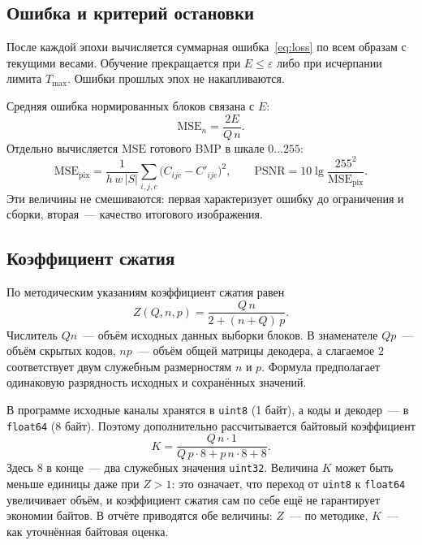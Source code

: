 \subsection{Ошибка и критерий остановки}
\label{sec:theory-stop}

После каждой эпохи вычисляется суммарная ошибка~\eqref{eq:loss} по всем образам с текущими весами. Обучение прекращается при $E \le \varepsilon$ либо при исчерпании лимита $T_{\max}$. Ошибки прошлых эпох не накапливаются.

Средняя ошибка нормированных блоков связана с $E$:
\begin{equation}
	\mathrm{MSE}_n = \frac{2E}{Q\,n}.
	\label{eq:mse-n}
\end{equation}
Отдельно вычисляется $\mathrm{MSE}$ готового BMP в шкале $0\ldots255$:
\begin{equation}
	\mathrm{MSE}_{\mathrm{pix}} = \frac{1}{h\,w\,|S|}
	  \sum_{i,j,c}\bigl(C_{ijc}-C'_{ijc}\bigr)^2,
	\qquad
	\mathrm{PSNR} = 10\lg\frac{255^2}{\mathrm{MSE}_{\mathrm{pix}}}.
	\label{eq:psnr}
\end{equation}
Эти величины не смешиваются: первая характеризует ошибку до ограничения и сборки, вторая~--- качество итогового изображения.

\subsection{Коэффициент сжатия}
\label{sec:theory-comp}

По методическим указаниям коэффициент сжатия равен
\begin{equation}
	Z(Q,n,p) = \frac{Q\,n}{2+(n+Q)\,p}.
	\label{eq:Z-theory}
\end{equation}
Числитель $Qn$~--- объём исходных данных выборки блоков. В знаменателе $Qp$~--- объём скрытых кодов, $np$~--- объём общей матрицы декодера, а слагаемое $2$ соответствует двум служебным размерностям $n$ и $p$. Формула предполагает одинаковую разрядность исходных и сохранённых значений.

В программе исходные каналы хранятся в \texttt{uint8} (1 байт), а коды и декодер~--- в \texttt{float64} (8 байт). Поэтому дополнительно рассчитывается байтовый коэффициент
\begin{equation}
	K = \frac{Q\,n \cdot 1}{Q\,p \cdot 8 + p\,n \cdot 8 + 8}.
	\label{eq:K-byte}
\end{equation}
Здесь $8$ в конце~--- два служебных значения \texttt{uint32}. Величина $K$ может быть меньше единицы даже при $Z>1$: это означает, что переход от \texttt{uint8} к \texttt{float64} увеличивает объём, и коэффициент сжатия сам по себе ещё не гарантирует экономии байтов. В отчёте приводятся обе величины: $Z$~--- по методике, $K$~--- как уточнённая байтовая оценка.
